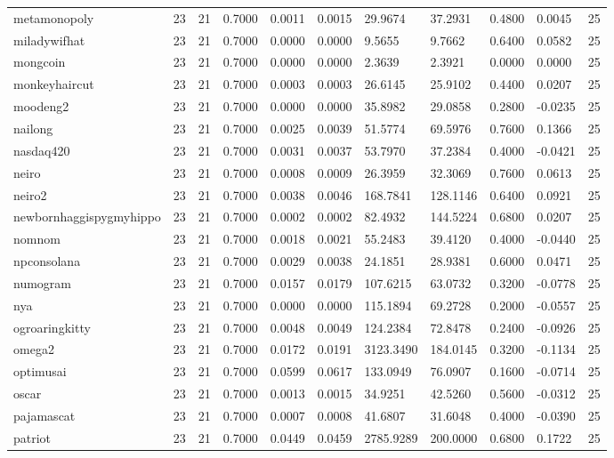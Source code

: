 \begin{table}[htbp]
\begin{tabular}{lllllllllll}
metamonopoly & 23 & 21 & 0.7000 & 0.0011 & 0.0015 & 29.9674 & 37.2931 & 0.4800 & 0.0045 & 25 \\
miladywifhat & 23 & 21 & 0.7000 & 0.0000 & 0.0000 & 9.5655 & 9.7662 & 0.6400 & 0.0582 & 25 \\
mongcoin & 23 & 21 & 0.7000 & 0.0000 & 0.0000 & 2.3639 & 2.3921 & 0.0000 & 0.0000 & 25 \\
monkeyhaircut & 23 & 21 & 0.7000 & 0.0003 & 0.0003 & 26.6145 & 25.9102 & 0.4400 & 0.0207 & 25 \\
moodeng2 & 23 & 21 & 0.7000 & 0.0000 & 0.0000 & 35.8982 & 29.0858 & 0.2800 & -0.0235 & 25 \\
nailong & 23 & 21 & 0.7000 & 0.0025 & 0.0039 & 51.5774 & 69.5976 & 0.7600 & 0.1366 & 25 \\
nasdaq420 & 23 & 21 & 0.7000 & 0.0031 & 0.0037 & 53.7970 & 37.2384 & 0.4000 & -0.0421 & 25 \\
neiro & 23 & 21 & 0.7000 & 0.0008 & 0.0009 & 26.3959 & 32.3069 & 0.7600 & 0.0613 & 25 \\
neiro2 & 23 & 21 & 0.7000 & 0.0038 & 0.0046 & 168.7841 & 128.1146 & 0.6400 & 0.0921 & 25 \\
newbornhaggispygmyhippo & 23 & 21 & 0.7000 & 0.0002 & 0.0002 & 82.4932 & 144.5224 & 0.6800 & 0.0207 & 25 \\
nomnom & 23 & 21 & 0.7000 & 0.0018 & 0.0021 & 55.2483 & 39.4120 & 0.4000 & -0.0440 & 25 \\
npconsolana & 23 & 21 & 0.7000 & 0.0029 & 0.0038 & 24.1851 & 28.9381 & 0.6000 & 0.0471 & 25 \\
numogram & 23 & 21 & 0.7000 & 0.0157 & 0.0179 & 107.6215 & 63.0732 & 0.3200 & -0.0778 & 25 \\
nya & 23 & 21 & 0.7000 & 0.0000 & 0.0000 & 115.1894 & 69.2728 & 0.2000 & -0.0557 & 25 \\
ogroaringkitty & 23 & 21 & 0.7000 & 0.0048 & 0.0049 & 124.2384 & 72.8478 & 0.2400 & -0.0926 & 25 \\
omega2 & 23 & 21 & 0.7000 & 0.0172 & 0.0191 & 3123.3490 & 184.0145 & 0.3200 & -0.1134 & 25 \\
optimusai & 23 & 21 & 0.7000 & 0.0599 & 0.0617 & 133.0949 & 76.0907 & 0.1600 & -0.0714 & 25 \\
oscar & 23 & 21 & 0.7000 & 0.0013 & 0.0015 & 34.9251 & 42.5260 & 0.5600 & -0.0312 & 25 \\
pajamascat & 23 & 21 & 0.7000 & 0.0007 & 0.0008 & 41.6807 & 31.6048 & 0.4000 & -0.0390 & 25 \\
patriot & 23 & 21 & 0.7000 & 0.0449 & 0.0459 & 2785.9289 & 200.0000 & 0.6800 & 0.1722 & 25 \\

\end{tabular}
\end{table}
